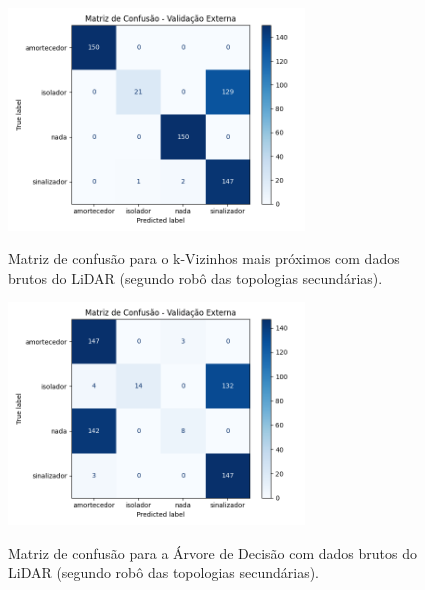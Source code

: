 
\begin{figure}[H]
\centering
\caption{Matriz de confusão para o k-Vizinhos mais próximos com dados brutos do LiDAR (segundo robô das topologias secundárias).}
\includegraphics[width=0.7\textwidth]{figuras/Resultados/multi_segundo_Teste2_knn.png}
\label{fig:mc_lidar_knn_robo2_t2}
\fonte{}
\end{figure}

\begin{figure}[H]
\centering
\caption{Matriz de confusão para a Árvore de Decisão com dados brutos do LiDAR (segundo robô das topologias secundárias).}
\includegraphics[width=0.7\textwidth]{figuras/Resultados/multi_segundo_Teste2_tree.png}
\label{fig:mc_lidar_tree_robo2_t2}
\fonte{}
\end{figure}

